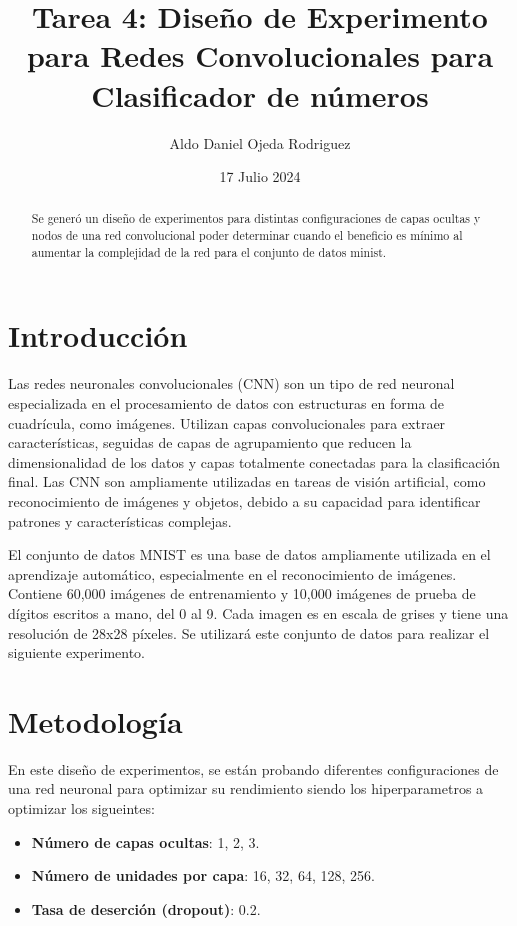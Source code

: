 \documentclass[a4paper,12pt]{article}
\title{Tarea 4:  Diseño de Experimento para Redes Convolucionales para Clasificador de números}
\author{Aldo Daniel Ojeda Rodriguez}
\date{17 Julio 2024}
\begin{document}
\maketitle

\begin{abstract}
 Se generó un diseño de experimentos  para distintas configuraciones de capas ocultas y nodos de una red convolucional poder determinar cuando el beneficio es mínimo al aumentar la complejidad de la red para el conjunto de datos minist.
\end{abstract}

\section{Introducción}

Las redes neuronales convolucionales (CNN) son un tipo de red neuronal especializada en el procesamiento de datos con estructuras en forma de cuadrícula, como imágenes. Utilizan capas convolucionales para extraer características, seguidas de capas de agrupamiento que reducen la dimensionalidad de los datos y capas totalmente conectadas para la clasificación final. Las CNN son ampliamente utilizadas en tareas de visión artificial, como reconocimiento de imágenes y objetos, debido a su capacidad para identificar patrones y características complejas\cite{IBM_CNN}.

El conjunto de datos MNIST es una base de datos ampliamente utilizada en el aprendizaje automático, especialmente en el reconocimiento de imágenes. Contiene 60,000 imágenes de entrenamiento y 10,000 imágenes de prueba de dígitos escritos a mano, del 0 al 9. Cada imagen es en escala de grises y tiene una resolución de 28x28 píxeles. 
Se utilizará este conjunto de datos para realizar el siguiente experimento.


\section{Metodología}

En este diseño de experimentos, se están probando diferentes configuraciones de una red neuronal para optimizar su rendimiento siendo los hiperparametros a optimizar los sigueintes: 

\begin{itemize}
    \item \textbf{Número de capas ocultas}: 1, 2, 3.
    \item \textbf{Número de unidades por capa}: 16, 32, 64, 128, 256.
    \item \textbf{Tasa de deserción (dropout)}: 0.2.
\end{itemize}
\end{document}
